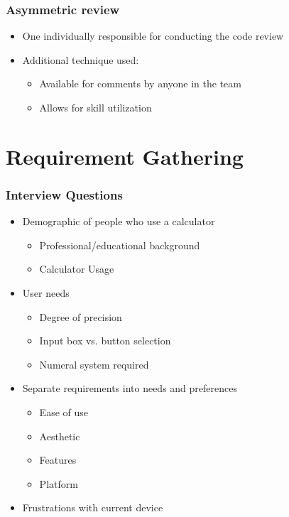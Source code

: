 \documentclass{beamer}
\begin{document}
  \begin{frame}
  \frametitle{Asymmetric review}
  \begin{itemize}
   \item One individually responsible for conducting the code review
   \item Additional technique used:
    \begin{itemize}
     \item Available for comments by anyone in the team
     \item Allows for skill utilization
    \end{itemize}
  \end{itemize}
  \end{frame}



  \section{Requirement Gathering}

  \begin{frame}
  \frametitle{Interview Questions}
  \begin{itemize}
   \item Demographic of people who use a calculator
    \begin{itemize}
     \item Professional/educational background
     \item Calculator Usage
    \end{itemize}
   \item User needs
    \begin{itemize}
     \item Degree of precision
     \item Input box vs. button selection
     \item Numeral system required
    \end{itemize}
   \item Separate requirements into needs and preferences
    \begin{itemize}
     \item Ease of use
     \item Aesthetic
     \item Features
     \item Platform
    \end{itemize}
     \item Frustrations with current device
  \end{itemize}
  \end{frame}
\end{document}
